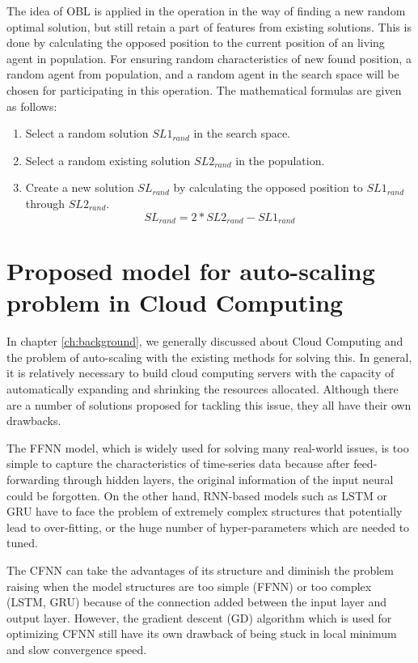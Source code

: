 \documentclass[a4paper,13pt,2p]{report}
\begin{document}
	
	The idea of OBL is applied in the operation in the way of finding a new random optimal solution, but still retain a part of features from existing solutions. This is done by calculating the opposed position to the current position of an living agent in population. For ensuring random characteristics of new found position, a random agent from population, and a random agent in the search space will be chosen for participating in this operation. The mathematical formulas are given as follows:
\begin{enumerate}
\item Select a random solution $SL1_{rand}$ in the search space.
\item Select a random existing solution $SL2_{rand}$ in the population.
\item Create a new solution $SL_{rand}$ by calculating the opposed position to $SL1_{rand}$ through $SL2_{rand}$.
\begin{equation} \label{islo_eq4}
SL_{rand} = 2*SL2_{rand} - SL1_{rand}
\end{equation}
\end{enumerate}

\section{Proposed model for auto-scaling problem in Cloud Computing}
\label{sec:proposed_model}
	
	In chapter \ref{ch:background}, we generally discussed about Cloud Computing and the problem of auto-scaling with the existing methods for solving this. In general, it is relatively necessary to build cloud computing servers with the capacity of automatically expanding and  shrinking the resources allocated. Although there are a number of solutions proposed for tackling this issue, they all have their own drawbacks.
	
	The FFNN model, which is widely used for solving many real-world issues, is too simple to capture the characteristics of time-series data because after feed-forwarding through hidden layers, the original information of the input neural could be forgotten. On the other hand, RNN-based models such as LSTM or GRU have to face the problem of extremely complex structures that potentially lead to over-fitting, or the huge number of hyper-parameters which are needed to tuned.
	
	The CFNN can take the advantages of its structure and diminish the problem raising when the model structures are too simple (FFNN) or too complex (LSTM, GRU) because of the connection added between the input layer and output layer. However, the gradient descent (GD) algorithm which is used for optimizing CFNN still have its own drawback of being stuck in local minimum and slow convergence speed. 
	
\end{document}
